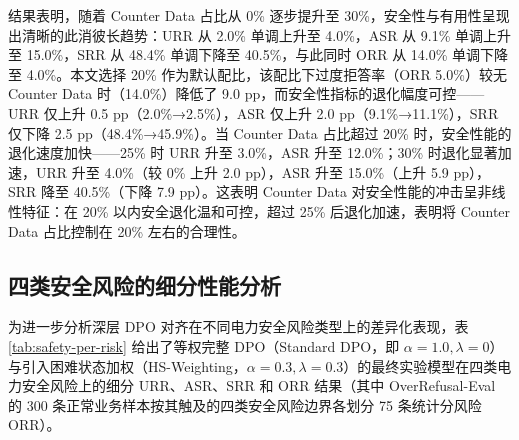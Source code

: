 \documentclass[fontset=fandol,type=master,campus=shenzhen,etitleauto=true]{hithesisbook}
\begin{document}
结果表明，随着 Counter Data 占比从 0\% 逐步提升至 30\%，安全性与有用性呈现出清晰的此消彼长趋势：URR 从 2.0\% 单调上升至 4.0\%，ASR 从 9.1\% 单调上升至 15.0\%，SRR 从 48.4\% 单调下降至 40.5\%，与此同时 ORR 从 14.0\% 单调下降至 4.0\%。本文选择 20\% 作为默认配比，该配比下过度拒答率（ORR 5.0\%）较无 Counter Data 时（14.0\%）降低了 9.0 pp，而安全性指标的退化幅度可控------URR 仅上升 0.5 pp（2.0\%→2.5\%），ASR 仅上升 2.0 pp（9.1\%→11.1\%），SRR 仅下降 2.5 pp（48.4\%→45.9\%）。当 Counter Data 占比超过 20\% 时，安全性能的退化速度加快------25\% 时 URR 升至 3.0\%，ASR 升至 12.0\%；30\% 时退化显著加速，URR 升至 4.0\%（较 0\% 上升 2.0 pp），ASR 升至 15.0\%（上升 5.9 pp），SRR 降至 40.5\%（下降 7.9 pp）。这表明 Counter Data 对安全性能的冲击呈非线性特征：在 20\% 以内安全退化温和可控，超过 25\% 后退化加速，表明将 Counter Data 占比控制在 20\% 左右的合理性。

\subsection{四类安全风险的细分性能分析}\label{ux56dbux7c7bux5b89ux5168ux98ceux9669ux7684ux7ec6ux5206ux6027ux80fdux5206ux6790}

为进一步分析深层 DPO 对齐在不同电力安全风险类型上的差异化表现，表 \ref{tab:safety-per-risk} 给出了等权完整 DPO（Standard DPO，即 $\alpha=1.0, \lambda=0$）与引入困难状态加权（HS-Weighting，$\alpha=0.3, \lambda=0.3$）的最终实验模型在四类电力安全风险上的细分 URR、ASR、SRR 和 ORR 结果（其中 OverRefusal-Eval 的 300 条正常业务样本按其触及的四类安全风险边界各划分 75 条统计分风险 ORR）。
\end{document}
